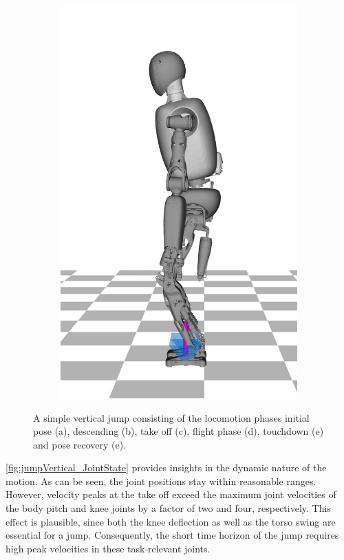 \begin{figure}[h!]
\begin{subfigure}{.16\textwidth}
	\includegraphics[width=1\linewidth]{fig/jumpVertical/snaps/6x}
	\caption{}
\end{subfigure}%
\caption[A simple vertical jump]{A simple vertical jump consisting of the locomotion phases initial pose (a), descending (b), take off (c), flight phase (d), touchdown (e) and pose recovery (e).}
\label{fig:jumpVertical_Snaps}
\end{figure} 

\cref{fig:jumpVertical_JointState} provides insights in the dynamic nature of the motion. As can be seen, the joint positions stay within reasonable ranges. However, velocity peaks at the take off exceed the maximum joint velocities of the body pitch and knee joints by a factor of two and four, respectively. This effect is plausible, since both the knee deflection as well as the torso swing are essential for a jump. Consequently, the short time horizon of the jump requires high peak velocities in these task-relevant joints. 

